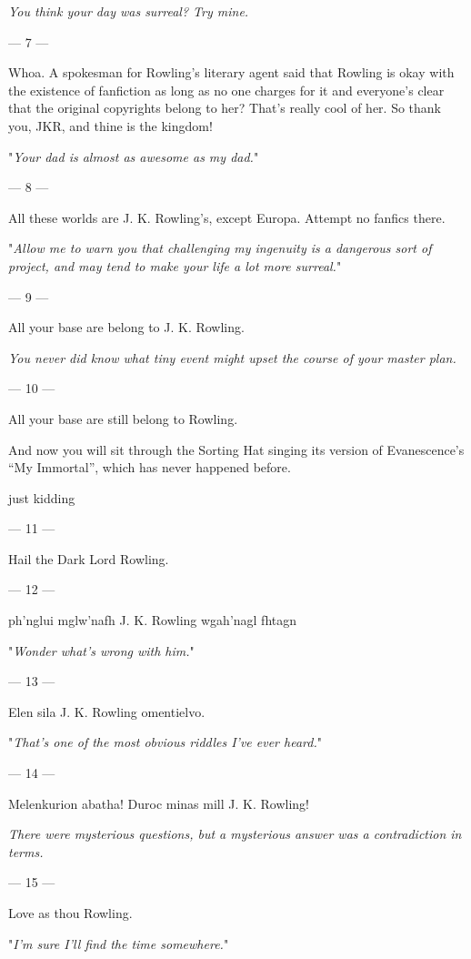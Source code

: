 {\emph{You think your day was surreal? Try mine.}

\filbreak
--- 7 ---

Whoa. A spokesman for Rowling’s literary agent said that Rowling is okay with the existence of fanfiction as long as no one charges for it and everyone’s clear that the original copyrights belong to her? That’s really cool of her. So thank you, JKR, and thine is the kingdom!

"\emph{Your dad is almost as awesome as my dad.}"

\filbreak
--- 8 ---

All these worlds are J. K. Rowling’s, except Europa. Attempt no fanfics there.

"\emph{Allow me to warn you that challenging my ingenuity is a dangerous sort of project, and may tend to make your life a lot more surreal.}"

\filbreak
--- 9 ---

All your base are belong to J. K. Rowling.

\emph{You never did know what tiny event might upset the course of your master plan.}

\filbreak
--- 10 ---

All your base are still belong to Rowling.

And now you will sit through the Sorting Hat singing its version of Evanescence’s “My Immortal”, which has never happened before.

just kidding

\filbreak
--- 11 ---

Hail the Dark Lord Rowling.

\filbreak
--- 12 ---

ph’nglui mglw’nafh J. K. Rowling wgah’nagl fhtagn

"\emph{Wonder what’s wrong with \emph{him}.}"

\filbreak
--- 13 ---

Elen sila J. K. Rowling omentielvo.

"\emph{That’s one of the most obvious riddles I’ve ever heard.}"

\filbreak
--- 14 ---

Melenkurion abatha! Duroc minas mill J. K. Rowling!

\emph{There were mysterious questions, but a mysterious answer was a
contradiction in terms.}

\filbreak
--- 15 ---

Love as thou Rowling.

"\emph{I’m sure I’ll find the time somewhere.}"

}
